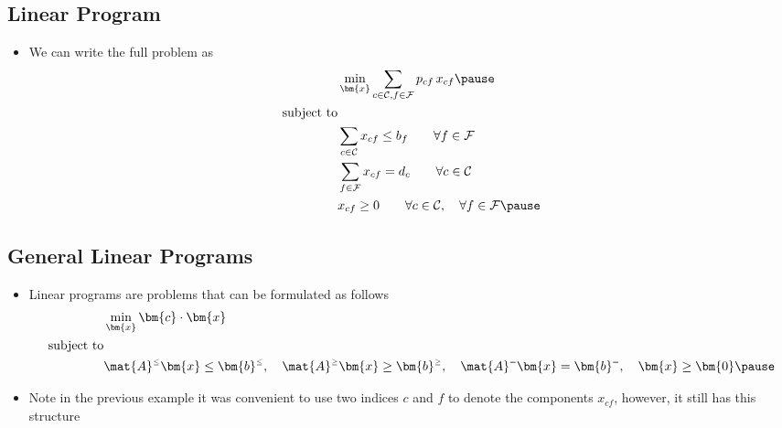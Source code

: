 
\begin{slide}
\section{Linear Program}

\begin{PauseHighLight}
  \begin{itemize}
  \item We can write the full problem as
    \begin{align*}
     & \min_{\bm{x}} \sum_{c\in\mathcal{C}, f\in\mathcal{F}} p_{cf}\,
      x_{cf} \pause \\
      \text{subject to}& \\
      &\sum_{c\in\mathcal{C}} x_{cf} \leq b_f \quad \quad \forall f \in
      \mathcal{F} \\
      &\sum_{f\in\mathcal{F}} x_{cf} = d_c \quad \quad \forall c \in
      \mathcal{C} \\
      &x_{cf} \geq 0 \quad \quad \forall c \in \mathcal{C}, \quad
      \forall f \in \mathcal{F}\pause
    \end{align*}
  \end{itemize}
\end{PauseHighLight}

\end{slide}

\Outline %

\begin{slide}
\section{General Linear Programs}

\begin{PauseHighLight}
  \begin{itemize}
  \item Linear programs are problems that can be formulated as follows
    \begin{align*}
      &\min_{\bm{x}} \bm{c}\cdot \bm{x} \\
      \text{subject to}&\\
      &\mat{A}^{\scriptscriptstyle \leq} \bm{x} \leq
      \bm{b}^{\scriptscriptstyle \leq},  \quad
      \mat{A}^{\scriptscriptstyle \geq} 
      \bm{x} \geq \bm{b}^{\scriptscriptstyle \geq}, \quad 
      \mat{A}^{\scriptscriptstyle =} \bm{x} = \bm{b}^{\scriptscriptstyle
        =}, \quad \bm{x} \geq \bm{0}\pause 
    \end{align*}
  \item Note in the previous example it was convenient to use two
    indices $c$ and $f$ to denote the components $x_{cf}$, however, it
    still has this structure\pause
  \end{itemize}
\end{PauseHighLight}

\end{slide}



